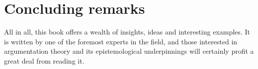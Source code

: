 \documentclass[12pt]{article}
\begin{document}
\section{Concluding remarks}

\noindent All in all, this book offers a wealth of
insights, ideas and interesting examples. It is written by one of the
foremost experts in the field, and those interested in argumentation
theory and its epistemological underpinnings will certainly profit a
great deal from reading it.
\end{document}
